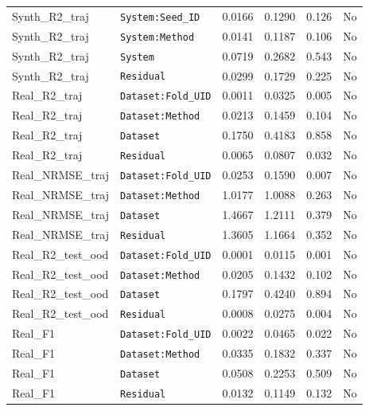 \begin{table}[t]
\begin{tabular}{llcccc}
\midrule
Synth\_R2\_traj & \texttt{System:Seed\_ID} & 0.0166 & 0.1290 & 0.126 & No \\
Synth\_R2\_traj & \texttt{System:Method} & 0.0141 & 0.1187 & 0.106 & No \\
Synth\_R2\_traj & \texttt{System} & 0.0719 & 0.2682 & 0.543 & No \\
Synth\_R2\_traj & \texttt{Residual} & 0.0299 & 0.1729 & 0.225 & No \\
\midrule
Real\_R2\_traj & \texttt{Dataset:Fold\_UID} & 0.0011 & 0.0325 & 0.005 & No \\
Real\_R2\_traj & \texttt{Dataset:Method} & 0.0213 & 0.1459 & 0.104 & No \\
Real\_R2\_traj & \texttt{Dataset} & 0.1750 & 0.4183 & 0.858 & No \\
Real\_R2\_traj & \texttt{Residual} & 0.0065 & 0.0807 & 0.032 & No \\
\midrule
Real\_NRMSE\_traj & \texttt{Dataset:Fold\_UID} & 0.0253 & 0.1590 & 0.007 & No \\
Real\_NRMSE\_traj & \texttt{Dataset:Method} & 1.0177 & 1.0088 & 0.263 & No \\
Real\_NRMSE\_traj & \texttt{Dataset} & 1.4667 & 1.2111 & 0.379 & No \\
Real\_NRMSE\_traj & \texttt{Residual} & 1.3605 & 1.1664 & 0.352 & No \\
\midrule
Real\_R2\_test\_ood & \texttt{Dataset:Fold\_UID} & 0.0001 & 0.0115 & 0.001 & No \\
Real\_R2\_test\_ood & \texttt{Dataset:Method} & 0.0205 & 0.1432 & 0.102 & No \\
Real\_R2\_test\_ood & \texttt{Dataset} & 0.1797 & 0.4240 & 0.894 & No \\
Real\_R2\_test\_ood & \texttt{Residual} & 0.0008 & 0.0275 & 0.004 & No \\
\midrule
Real\_F1 & \texttt{Dataset:Fold\_UID} & 0.0022 & 0.0465 & 0.022 & No \\
Real\_F1 & \texttt{Dataset:Method} & 0.0335 & 0.1832 & 0.337 & No \\
Real\_F1 & \texttt{Dataset} & 0.0508 & 0.2253 & 0.509 & No \\
Real\_F1 & \texttt{Residual} & 0.0132 & 0.1149 & 0.132 & No \\
\bottomrule
\end{tabular}
\end{table}
